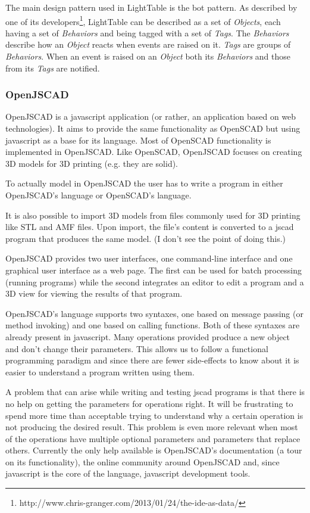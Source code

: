 \documentclass{./llncs2e/llncs}
\begin{document}
	The main design pattern used in LightTable is the \ac{bot} pattern. 
	As described by one of its developers\footnote{http://www.chris-granger.com/2013/01/24/the-ide-as-data/}, LightTable can be described as a set of \emph{Objects}, each having a set of \emph{Behaviors} and being tagged with a set of \emph{Tags}. 
	The \emph{Behaviors} describe how an \emph{Object} reacts when events are raised on it. \emph{Tags} are groups of \emph{Behaviors}. 
	When an event is raised on an \emph{Object} both its \emph{Behaviors} and those from its \emph{Tags} are notified.

\subsubsection{OpenJSCAD}
	OpenJSCAD is a javascript application (or rather, an application based on web technologies).
	It aims to provide the same functionality as OpenSCAD but using javascript as a base for its language. 
	Most of OpenSCAD functionality is implemented in OpenJSCAD. 
	Like OpenSCAD, OpenJSCAD focuses on creating 3D models for 3D printing (e.g. they are solid).

	To actually model in OpenJSCAD the user has to write a program in either OpenJSCAD's language or OpenSCAD's language.

	It is also possible to import 3D models from files commonly used for 3D printing like STL and AMF files.
	Upon import, the file's content is converted to a jscad program that produces the same model. (I don't see the point of doing this.)

	OpenJSCAD provides two user interfaces, one command-line interface and one graphical user interface as a web page.
	The first can be used for batch processing (running programs) while the second integrates an editor to edit a program and a 3D view for viewing the results of that program.

	OpenJSCAD's language supports two syntaxes, one based on message passing (or method invoking) and one based on calling functions.
	Both of these syntaxes are already present in javascript. 
	Many operations provided produce a new object and don't change their parameters. 
	This allows us to follow a functional programming paradigm and since there are fewer side-effects to know about it is easier to understand a program written using them.

	A problem that can arise while writing and testing jscad programs is that there is no help on getting the parameters for operations right.
	It will be frustrating to spend more time than acceptable trying to understand why a certain operation is not producing the desired result. 
	This problem is even more relevant when most of the operations have multiple optional parameters and parameters that replace others. 
	Currently the only help available is OpenJSCAD's documentation (a tour on its functionality), the online community around OpenJSCAD and, since javascript is the core of the language, javascript development tools.
\end{document}
